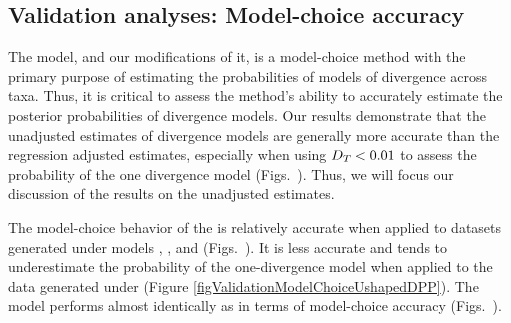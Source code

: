 \documentclass[letterpaper,12pt]{article}
\begin{document}
\begin{linenumbers}
\subsection*{Validation analyses: Model-choice accuracy}
The \msb model, and our modifications of it, is a model-choice method
with the primary purpose of estimating the probabilities of models
of divergence across taxa.
Thus, it is critical to assess the method's ability to accurately
estimate the posterior probabilities of divergence models.
Our results demonstrate that the unadjusted estimates of
divergence models are generally more accurate than the regression
adjusted estimates, especially when using $D_{T_{}} < 0.01$
to assess the probability of the one divergence model (Figs.\
).
Thus, we will focus our discussion of the results on the unadjusted estimates.

The model-choice behavior of the \modelDPP is relatively accurate when applied
to datasets generated under models \modelDPP, \modelUniform, and \modelOld
(Figs.\
).
It is less accurate and tends to underestimate the probability of the
one-divergence model when applied to the data generated under \modelUshaped
(Figure \ref{figValidationModelChoiceUshapedDPP}).
The \modelUniform model performs almost identically as \modelDPP in
terms of model-choice accuracy (Figs.\
).


\end{linenumbers}
\end{document}
